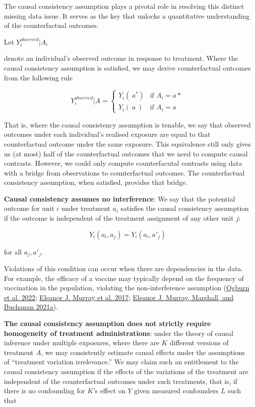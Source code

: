 \documentclass[
  singlecolumn]{report}
\begin{document}
The causal consistency assumption plays a pivotal role in resolving this
distinct missing data issue. It serves as the key that unlocks a
quantitative understanding of the counterfactual outcomes.

Let \(Y_i^{observed}|A_i\)

denote an individual's observed outcome in response to treatment. Where
the causal consistency assumption is satisfied, we may derive
counterfactual outcomes from the following rule

\[
Y_i^{observed}|A = 
\begin{cases} 
Y_i(~a^*) & \text{if } A_i = a* \\
Y_i(~a~) & \text{if } A_i = a
\end{cases}
\]

That is, where the causal consistency assumption is tenable, we say that
observed outcomes under each individual's realised exposure are equal to
that counterfactual outcome under the same exposure. This equivalence
still only gives us (at most) half of the counterfactual outcomes that
we need to compute causal contrasts. However, we could only compute
counterfacutal contrasts using data with a bridge from observations to
counterfactual outcomes. The counterfactual consistency assumption, when
satisfied, provides that bridge.

\textbf{Causal consistency assumes no interference}: We say that the
potential outcome for unit \(i\) under treatment \(a_i\) satisfies the
causal consistency assumption if the outcome is independent of the
treatment assignment of any other unit \(j\):

\[
Y_i(a_i, a_j) = Y_i(a_i, a'_j)
\]

for all \(a_j, a'_j\).

Violations of this condition can occur when there are dependencies in
the data. For example, the efficacy of a vaccine may typically depend on
the frequency of vaccination in the population, violating the
non-interference assumption (\protect\hyperlink{ref-ogburn2022}{Ogburn
et al. 2022}; \protect\hyperlink{ref-murray2017}{Eleanor J. Murray et
al. 2017}; \protect\hyperlink{ref-murray2021}{Eleanor J. Murray,
Marshall, and Buchanan 2021a}).

\textbf{The causal consistency assumption does not strictly require
homogeneity of treatment administrations}: under the theory of causal
inference under multiple exposures, where there are \(K\) different
versions of treatment \(A\), we may consistently estimate causal effects
under the assumptions of ``treatment variation irrelevance.'' We may
claim such an entitlement to the causal consistency assumption if the
effects of the variations of the treatment are independent of the
counterfactual outcomes under such treatments, that is, if there is no
confounding for \(K\)'s effect on \(Y\) given measured confounders \(L\)
such that
\end{document}
